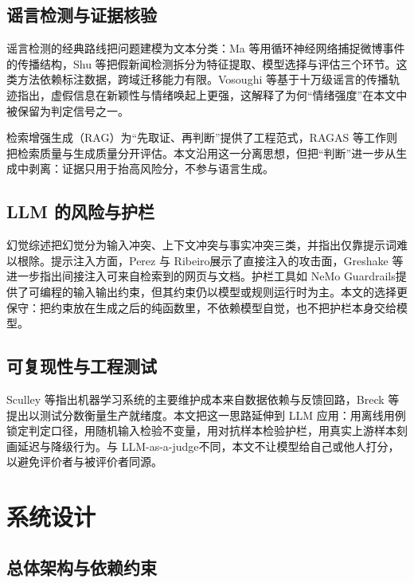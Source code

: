 \documentclass[12pt,a4paper,fontset=windows]{ctexart}
\begin{document}
\subsection{谣言检测与证据核验}

谣言检测的经典路线把问题建模为文本分类：Ma 等\cite{ma2016rumor}用循环神经网络捕捉微博事件的传播结构，Shu 等\cite{shu2017fake}把假新闻检测拆分为特征提取、模型选择与评估三个环节。这类方法依赖标注数据，跨域迁移能力有限。Vosoughi 等\cite{vosoughi2018science}基于十万级谣言的传播轨迹指出，虚假信息在新颖性与情绪唤起上更强，这解释了为何“情绪强度”在本文中被保留为判定信号之一。

检索增强生成（RAG）为“先取证、再判断”提供了工程范式\cite{lewis2020rag}，RAGAS 等工作则把检索质量与生成质量分开评估\cite{es2024ragas}。本文沿用这一分离思想，但把“判断”进一步从生成中剥离：证据只用于抬高风险分，不参与语言生成。

\subsection{LLM 的风险与护栏}

幻觉综述\cite{ji2023hallucination}把幻觉分为输入冲突、上下文冲突与事实冲突三类，并指出仅靠提示词难以根除。提示注入方面，Perez 与 Ribeiro\cite{perez2022ignore}展示了直接注入的攻击面，Greshake 等\cite{greshake2023not}进一步指出间接注入可来自检索到的网页与文档。护栏工具如 NeMo Guardrails\cite{rebedea2023nemo}提供了可编程的输入输出约束，但其约束仍以模型或规则运行时为主。本文的选择更保守：把约束放在生成之后的纯函数里，不依赖模型自觉，也不把护栏本身交给模型。

\subsection{可复现性与工程测试}

Sculley 等\cite{sculley2015hidden}指出机器学习系统的主要维护成本来自数据依赖与反馈回路，Breck 等\cite{breck2017mltest}提出以测试分数衡量生产就绪度。本文把这一思路延伸到 LLM 应用：用离线用例锁定判定口径，用随机输入检验不变量，用对抗样本检验护栏，用真实上游样本刻画延迟与降级行为。与 LLM-as-a-judge\cite{zheng2023judging}不同，本文不让模型给自己或他人打分，以避免评价者与被评价者同源。

\section{系统设计}\label{sec:design}

\subsection{总体架构与依赖约束}
\end{document}
